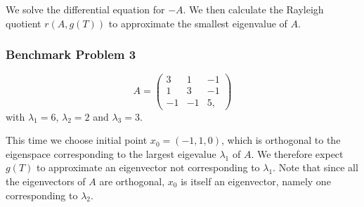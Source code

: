 We solve the differential equation for $-A$. We then calculate the Rayleigh quotient $r(A,g(T))$ to approximate the smallest eigenvalue of $A$.

\subsubsection{Benchmark Problem 3}\label{sec:benchmark problem 3}
\begin{equation}\label{eq:33mat2}
    A = \left(\begin{array}{ccc}
        3 & 1 & -1 \\
        1 & 3 & -1 \\
        -1 & -1 & 5,
    \end{array}\right)
\end{equation}
with $\lambda_1 = 6$, $\lambda_2 = 2$ and $\lambda_3 = 3$.

This time we choose initial point $x_0=(-1, 1, 0)$, which is orthogonal to the eigenspace corresponding to the largest eigevalue $\lambda_1$ of $A$. We therefore expect $g(T)$ to approximate an eigenvector not corresponding to $\lambda_1$. Note that since all the eigenvectors of $A$ are orthogonal, $x_0$ is itself an eigenvector, namely one corresponding to $\lambda_2$.


